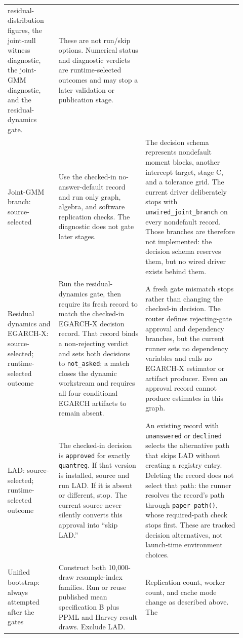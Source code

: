 \documentclass[11pt]{article}
\DeclareRobustCommand{\code}[1]{%
  \ifmmode\text{\ttfamily\detokenize{#1}}\else\nolinkurl{#1}\fi}
\begin{document}
\begin{landscape}
\begin{longtable}{@{}>{\raggedright\arraybackslash}p{0.20\linewidth}
  >{\raggedright\arraybackslash}p{0.34\linewidth}
  >{\raggedright\arraybackslash}p{0.38\linewidth}@{}}
residual-distribution figures, the joint-null witness diagnostic, the joint-GMM
diagnostic, and the residual-dynamics gate. &
These are not run/skip options. Numerical status and diagnostic verdicts are
runtime-selected outcomes and may stop a later validation or publication stage.\\
Joint-GMM branch: source-selected &
Use the checked-in no-answer-default record and run only graph, algebra, and
software replication checks. The diagnostic does not gate later stages. &
The decision schema represents nondefault moment blocks, another intercept target,
stage C, and a tolerance grid. The current driver deliberately stops with
\code{unwired_joint_branch} on every nondefault record. Those branches are
therefore not implemented: the decision schema reserves them, but no wired
driver exists behind them.\\
Residual dynamics and EGARCH-X: source-selected; runtime-selected outcome &
Run the residual-dynamics gate, then require its fresh record to match the
checked-in EGARCH-X decision record. That record binds a non-rejecting verdict
and sets both decisions to \code{not_asked}; a match closes the dynamic workstream and
requires all four conditional EGARCH artifacts to remain absent. &
A fresh gate mismatch stops rather than changing the checked-in decision. The
router defines rejecting-gate approval and dependency branches, but the current
runner sets no dependency variables and calls no EGARCH-X estimator or artifact
producer. Even an approval record cannot produce estimates in this graph.\\
LAD: source-selected; runtime-selected outcome &
The checked-in decision is \code{approved} for exactly \code{quantreg} 6.1. If
that version is installed, source and run LAD. If it is absent or different,
stop. The current source never silently converts this approval into ``skip LAD.'' &
An existing record with \code{unanswered} or \code{declined} selects the
alternative path that skips LAD without creating a registry entry. Deleting the
record does not select that path: the runner resolves the record's path through
\code{paper_path()}, whose required-path check stops first. These are tracked
decision alternatives, not launch-time environment choices.\\
Unified bootstrap: always attempted after the gates &
Construct both 10,000-draw resample-index families. Run or reuse published mean
specification B plus PPML and Harvey result draws. Exclude LAD. &
Replication count, worker count, and cache mode change as described above. The

\end{longtable}
\end{landscape}
\end{document}
